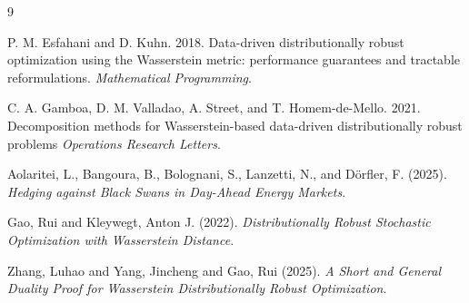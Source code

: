 \documentclass[11pt]{article}
\theoremstyle{plain}
\theoremstyle{definition}
\begin{document}
\begin{thebibliography}{9}

P. M. Esfahani and D. Kuhn. 2018.
Data-driven distributionally robust optimization using the Wasserstein metric: performance guarantees and tractable reformulations.
\emph{Mathematical Programming}.

C. A. Gamboa, D. M. Valladao, A. Street, and T. Homem-de-Mello. 2021. Decomposition methods for Wasserstein-based data-driven distributionally robust problems
\emph{Operations Research Letters}.

Aolaritei, L., Bangoura, B., Bolognani, S., Lanzetti, N., and Dörfler, F. (2025). 
\textit{Hedging against Black Swans in Day-Ahead Energy Markets}.

Gao, Rui and Kleywegt, Anton J. (2022). 
\textit{Distributionally Robust Stochastic Optimization with Wasserstein Distance}.

Zhang, Luhao and Yang, Jincheng and Gao, Rui (2025). 
\textit{A Short and General Duality Proof for Wasserstein Distributionally Robust Optimization}.
\end{thebibliography}
\end{document}
